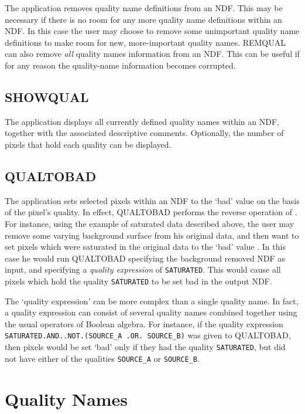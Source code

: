 \documentclass[twoside,11pt,nolof]{starlink}
\begin{document}
The  application removes quality name
definitions from an NDF. This may be necessary if there is no room for
any more quality name definitions within an NDF. In this case the user
may choose to remove some unimportant quality name definitions to make
room for new, more-important quality names. REMQUAL can also remove \emph{all} quality names information from an NDF. This can be useful if for any
reason the quality-name information becomes corrupted.

\subsection{SHOWQUAL}
The  application displays all currently
defined quality names within an NDF, together with the associated
descriptive comments. Optionally, the number of pixels that hold each
quality can be displayed.

\subsection{QUALTOBAD}

The  application sets selected
pixels within an NDF to the `bad' value on the basis of the pixel's
quality. In effect, QUALTOBAD performs the reverse operation of
. For instance, using the example of saturated
data described above, the user may remove some varying background surface
from his original data, and then want to set pixels which were saturated
in the original data to the `bad' value . In this case he would run
QUALTOBAD specifying the background removed NDF as input, and specifying
a \emph{quality expression} of \texttt{SATURATED}. This would cause all pixels
which hold the quality \texttt{SATURATED} to be set bad in the output NDF.

The `quality expression' can be more complex than a single quality
name. In fact, a quality expression can consist of several quality
names combined together using the usual operators of Boolean algebra.
For instance, if the quality expression \texttt{SATURATED.AND..NOT.(SOURCE\_A .OR. SOURCE\_B)} was given to
QUALTOBAD, then pixels would be set `bad' only if they had the quality
\texttt{SATURATED}, but did not have either of the qualities \texttt{SOURCE\_A} or \texttt{SOURCE\_B}.

\section{Quality Names}
\end{document}
